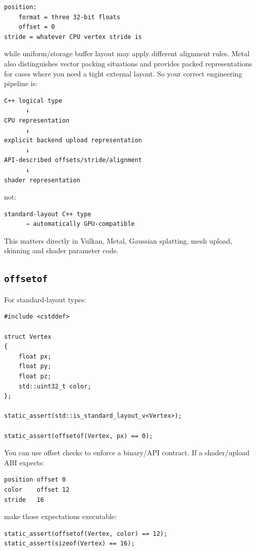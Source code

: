 \begin{verbatim}
position:
    format = three 32-bit floats
    offset = 0
stride = whatever CPU vertex stride is
\end{verbatim}

while uniform/storage buffer layout may apply different alignment rules. Metal also distinguishes vector packing situations and provides packed representations for cases where you need a tight external layout. So your correct engineering pipeline is:

\begin{verbatim}
C++ logical type
      ↓
CPU representation
      ↓
explicit backend upload representation
      ↓
API-described offsets/stride/alignment
      ↓
shader representation
\end{verbatim}

not:

\begin{verbatim}
standard-layout C++ type
      ⇒ automatically GPU-compatible
\end{verbatim}

This matters directly in Vulkan, Metal, Gaussian splatting, mesh upload, skinning and shader parameter code.

\subsection{\texorpdfstring{\texttt{offsetof}}{offsetof}}\label{01-foundations-i-ch003-offsetof}

For standard-layout types:

\begin{verbatim}
#include <cstddef>

struct Vertex
{
    float px;
    float py;
    float pz;
    std::uint32_t color;
};

static_assert(std::is_standard_layout_v<Vertex>);

static_assert(offsetof(Vertex, px) == 0);
\end{verbatim}

You can use offset checks to enforce a binary/API contract. If a shader/upload ABI expects:

\begin{verbatim}
position offset 0
color    offset 12
stride   16
\end{verbatim}

make those expectations executable:

\begin{verbatim}
static_assert(offsetof(Vertex, color) == 12);
static_assert(sizeof(Vertex) == 16);
\end{verbatim}

